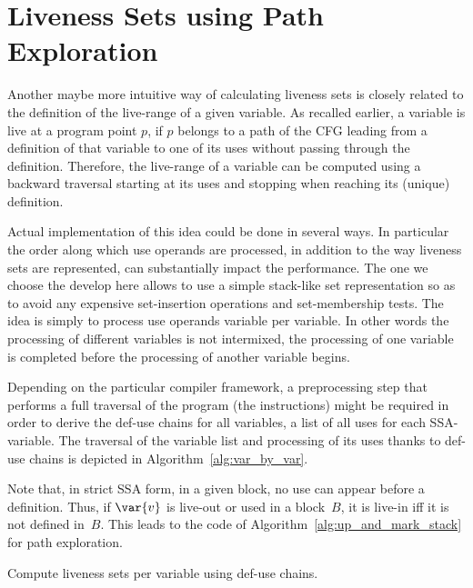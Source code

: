 \section{Liveness Sets using Path Exploration}
\label{sec:path-explore}

Another maybe more intuitive way of calculating liveness sets is closely related to the definition of the live-range of a given variable.
As recalled earlier, a variable is live at a program point $p$, if $p$ belongs to a path of the CFG leading from a definition of that variable to one of its uses without passing through the definition.
Therefore, the live-range of a variable can be computed using a backward traversal starting at its uses and stopping when reaching its (unique) definition.

Actual implementation of this  idea could be done in several ways.
In particular the order along which use operands are processed, in addition to the way liveness sets are represented, can substantially impact the performance.
The one we choose the develop here allows to use a simple stack-like set representation so as to avoid any expensive set-insertion operations and set-membership tests.
The idea is simply to process use operands variable per variable.
In other words the processing of different variables is not intermixed, \ie the processing of one variable is completed before the processing of another variable begins.

Depending on the particular compiler framework, a preprocessing step that performs a full traversal of the program (\ie the instructions) might be required in order to derive the def-use chains for all variables, \ie a list of all uses for each SSA-variable.
The traversal of the variable list and processing of its uses thanks to def-use chains is depicted in Algorithm~\ref{alg:var_by_var}.

Note that, in strict SSA form, in a given block, no use can appear before a definition.
Thus, if $\var{v}$ is live-out or used in a block~$B$, it is live-in iff it is not defined in~$B$.
This leads to the code of Algorithm~\ref{alg:up_and_mark_stack} for path exploration.


\begin{algorithm}[h]
  \caption{Compute liveness sets per variable using def-use chains.}
  \label{alg:var_by_var}
\end{algorithm}




